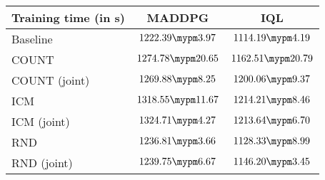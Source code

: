\begin{tabular}{l | c c}
	Training time (in s) & MADDPG & IQL\\ \toprule
		Baseline & $1222.39 \mypm 3.97$ & $1114.19 \mypm 4.19$ \\ \midrule
	COUNT & $1274.78 \mypm 20.65$ & $1162.51 \mypm 20.79$ \\
	COUNT (joint) & $1269.88 \mypm 8.25$ & $1200.06 \mypm 9.37$ \\\midrule
	ICM & $1318.55 \mypm 11.67$ & $1214.21 \mypm 8.46$ \\
	ICM (joint) & $1324.71 \mypm 4.27$ & $1213.64 \mypm 6.70$ \\\midrule
	RND & $1236.81 \mypm 3.66$ & $1128.33 \mypm 8.99$ \\
	RND (joint) & $1239.75 \mypm 6.67$ & $1146.20 \mypm 3.45$ \\\midrule
\end{tabular}
